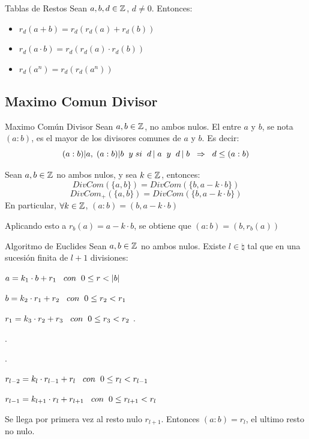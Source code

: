 \documentclass[10pt]{article}
\begin{document}
\begin{cor}{Tablas de Restos}
 Sean $a,b,d \in \entero{}$, $d \neq 0$. Entonces:
 \begin{itemize}
  \item $r_d(a+b) = r_d(r_d(a)+r_d(b))$
  \item $r_d(a\cdot b) = r_d(r_d(a) \cdot r_d(b))$
  \item $r_d(a^n) = r_d(r_d(a^n))$
 \end{itemize}
\end{cor}

\begin{center}
\subsection{Maximo Comun Divisor} 
\end{center}

\begin{defi}{Maximo Común Divisor}
Sean $a,b \in \entero{}$, no ambos nulos. El  entre $a$ y $b$, se nota $(a:b)$, es el mayor de los divisores comunes de $a$ y  $b$. Es decir:
\[(a:b) | a, \es{0.1} (a:b) | b \es{0.2} y \es{0.1} si \es{0.2} \divi{d}{a} \es{0.2} y \es{0.2} \divi{d}{b} \es{0.2} \implica \es{0.2} d \menig (a:b)\]
\end{defi}

\begin{propo}{}
 Sean $a, b \in \entero{}$ no ambos nulos, y sea $k \in \entero{}$, entonces:
 \[DivCom(\{a,b\})   =  DivCom(\{b,a - k \cdot b\})\]
 \[DivCom_+(\{a,b\}) =  DivCom(\{b,a - k \cdot b\})\]
 En particular, $\forall k \in \entero{}$, $(a:b) = (b,a - k \cdot b)$
 
 Aplicando esto a $r_b(a) = a - k\cdot b$, se obtiene que $(a:b) = (b,r_b(a))$
\end{propo}

\begin{teo}{Algoritmo de Euclides}
Sean $a, b \in \entero{}$ no ambos nulos. Existe $l \in \natural{}$ tal que en una sucesión finita de $l+1$ divisiones:
\begin{center}
$a = k_1 \cdot b + r_1     \es{0.3} con \es{0.2} 0 \menig r   < |b|$

$b = k_2 \cdot r_1 + r_2   \es{0.3} con \es{0.2} 0 \menig r_2 < r_1$ 

$r_1 = k_3 \cdot r_2 + r_3 \es{0.3} con \es{0.2} 0 \menig r_3 < r_2$
.

.

.

$r_{l-2} = k_l \cdot r_{l-1} + r_l \es{0.3} con \es{0.2} 0 \menig r_l < r_{l-1}$

$r_{l-1} = k_{l+1} \cdot r_{l} + r_{l+1} \es{0.3} con \es{0.2} 0 \menig r_{l+1} < r_{l}$
\end{center}
Se llega por primera vez al resto nulo $r_{l+1}$. Entonces $(a:b)=r_l$, el ultimo resto no nulo. 
\end{teo}
\end{document}
